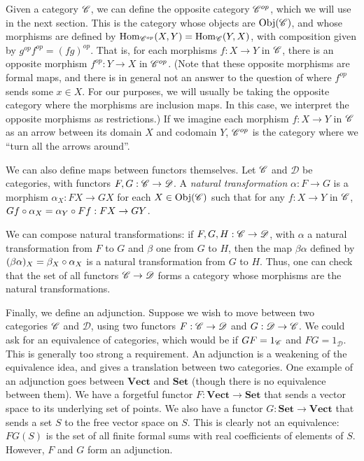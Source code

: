 \documentclass[a4paper,12pt,leqno]{article} \usepackage{amsmath}
\newcommand{\curD}{\mathscr{D}} \newcommand{\curI}{\mathscr{I}}
\newcommand{\Hom}{\ensuremath{\operatorname{Hom}}}
\newcommand{\Obj}{\ensuremath{\operatorname{Obj}}}
\theoremstyle{definition}
\begin{document}
Given a category $\mathscr{C}$, we can define the opposite category $\mathscr{C}^{op}$,
which we will use in the next section.
This is the category whose objects are
$\Obj(\curC)$, and whose morphisms are defined by $\Hom_{\curC^{op}}(X, Y)
= \Hom_{\curC}(Y, X)$, with composition given by $g^{op}f^{op} = (fg)^{op}$.
That is, for each morphisms $f: X\to Y$ in $\mathscr{C}$, there is an opposite
morphism $f^{op}: Y\to X$ in $\mathscr{C}^{op}$.
(Note that these opposite morphisms
are formal maps, and there is in general not an answer to the question of where
$f^{op}$ sends some $x\in X$.
For our purposes, we will usually be taking the
opposite category where the morphisms are inclusion maps.
In this case, we
interpret the opposite morphisms as restrictions.) If we imagine each morphism
$f: X\to Y$ in $\mathscr{C}$ as an arrow between its domain $X$ and codomain $Y$,
$\mathscr{C}^{op}$ is the category where we ``turn all the arrows around''.

We can also define maps between functors themselves.
Let $\mathscr{C}$ and $\curD$ be
categories, with functors $F, G: \curC\to \curD$.
A \emph{natural
transformation} $\alpha: F\to G$ is a morphism $\alpha_X: FX\to GX$ for each
$X\in \Obj(\curC)$ such that for any $f: X\to Y$ in $\mathscr{C}$, $Gf\circ \alpha_X
= \alpha_Y\circ Ff: FX\to GY$.

We can compose natural transformations: if $F, G, H: \curC\to \curD$, with
$\alpha$ a natural transformation from $F$ to $G$ and $\beta$ one from $G$ to
$H$, then the map $\beta\alpha$ defined by $(\beta\alpha)_X = \beta_X\circ
\alpha_X$ is a natural transformation from $G$ to $H$.
Thus, one can check that
the set of all functors $\curC\to\curD$ forms a category whose morphisms are the
natural transformations.

Finally, we define an adjunction.
Suppose we wish to move between two
categories $\mathscr{C}$ and $\curD$, using two functors $F: \curC\to\curD$ and $G:
\curD\to\curC$.
We could ask for an equivalence of categories, which would be
if $GF = 1_{\mathscr{C}}$ and $FG = 1_{\curD}$.
This is generally too strong
a requirement.
An adjunction is a weakening of the equivalence idea, and gives
a translation between two categories.
One example of an adjunction goes between
$\textbf{Vect}$ and $\textbf{Set}$ (though there is no equivalence between
them).
We have a forgetful functor $F: \textbf{Vect}\to \textbf{Set}$ that
sends a vector space to its underlying set of points.
We also have a functor
$G: \textbf{Set}\to \textbf{Vect}$ that sends a set $S$ to the free vector space
on $S$.
This is clearly not an equivalence: $FG(S)$ is the set of all finite
formal sums with real coefficients of elements of $S$.
However, $F$ and $G$
form an adjunction.
\end{document}
